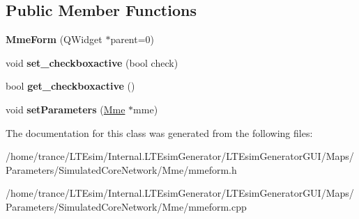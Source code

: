 \subsection*{Public Member Functions}
\begin{DoxyCompactItemize}
\item 
{\bfseries Mme\+Form} (Q\+Widget $\ast$parent=0)\hypertarget{class_mme_form_ac874e594c3e782df3a64f96dee381a3a}{}\label{class_mme_form_ac874e594c3e782df3a64f96dee381a3a}

\item 
void {\bfseries set\+\_\+checkboxactive} (bool check)\hypertarget{class_mme_form_adacb05c9cb502d96f9dfe25831e51d83}{}\label{class_mme_form_adacb05c9cb502d96f9dfe25831e51d83}

\item 
bool {\bfseries get\+\_\+checkboxactive} ()\hypertarget{class_mme_form_a4203c96c632862efc4349bf2c6125260}{}\label{class_mme_form_a4203c96c632862efc4349bf2c6125260}

\item 
void {\bfseries set\+Parameters} (\hyperlink{class_mme}{Mme} $\ast$mme)\hypertarget{class_mme_form_a8cf75a3ebdf084d2369e1bc2187ba7ab}{}\label{class_mme_form_a8cf75a3ebdf084d2369e1bc2187ba7ab}

\end{DoxyCompactItemize}


The documentation for this class was generated from the following files\+:\begin{DoxyCompactItemize}
\item 
/home/trance/\+L\+T\+Esim/\+Internal.\+L\+T\+Esim\+Generator/\+L\+T\+Esim\+Generator\+G\+U\+I/\+Maps/\+Parameters/\+Simulated\+Core\+Network/\+Mme/mmeform.\+h\item 
/home/trance/\+L\+T\+Esim/\+Internal.\+L\+T\+Esim\+Generator/\+L\+T\+Esim\+Generator\+G\+U\+I/\+Maps/\+Parameters/\+Simulated\+Core\+Network/\+Mme/mmeform.\+cpp\end{DoxyCompactItemize}
